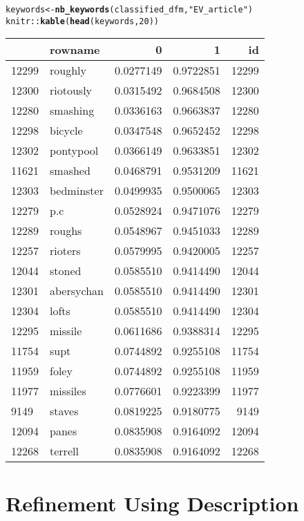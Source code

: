 \documentclass{article}\usepackage[]{graphicx}\usepackage[]{color}
\makeatletter
\newcommand{\hlnum}[1]{\textcolor[rgb]{0.686,0.059,0.569}{#1}}%
\newcommand{\hlstr}[1]{\textcolor[rgb]{0.192,0.494,0.8}{#1}}%
\newcommand{\hlopt}[1]{\textcolor[rgb]{0,0,0}{#1}}%
\newcommand{\hlstd}[1]{\textcolor[rgb]{0.345,0.345,0.345}{#1}}%
\newcommand{\hlkwb}[1]{\textcolor[rgb]{0.69,0.353,0.396}{#1}}%
\newcommand{\hlkwd}[1]{\textcolor[rgb]{0.737,0.353,0.396}{\textbf{#1}}}%
\newenvironment{kframe}{%
 \def\at@end@of@kframe{}%
 \ifinner\ifhmode%
  \def\at@end@of@kframe{\end{minipage}}%
  \begin{minipage}{\columnwidth}%
 \fi\fi%
 \def\FrameCommand##1{\hskip\@totalleftmargin \hskip-\fboxsep
 \colorbox{shadecolor}{##1}\hskip-\fboxsep
     \hskip-\linewidth \hskip-\@totalleftmargin \hskip\columnwidth}%
 \MakeFramed {\advance\hsize-\width
   \@totalleftmargin\z@ \linewidth\hsize
   \@setminipage}}%
 {\par\unskip\endMakeFramed%
 \at@end@of@kframe}
\newenvironment{knitrout}{}{} %
\makeatother
\begin{document}
\begin{knitrout}
\begin{kframe}
\begin{alltt}
\hlstd{keywords}\hlkwb{<-}\hlkwd{nb_keywords}\hlstd{(classified_dfm,} \hlstr{"EV_article"}\hlstd{)}
\hlstd{knitr}\hlopt{::}\hlkwd{kable}\hlstd{(}\hlkwd{head}\hlstd{(keywords,} \hlnum{20}\hlstd{))}
\end{alltt}
\end{kframe}
\begin{tabular}{l|l|r|r|r}
\hline
  & rowname & 0 & 1 & id\\
\hline
12299 & roughly & 0.0277149 & 0.9722851 & 12299\\
\hline
12300 & riotously & 0.0315492 & 0.9684508 & 12300\\
\hline
12280 & smashing & 0.0336163 & 0.9663837 & 12280\\
\hline
12298 & bicycle & 0.0347548 & 0.9652452 & 12298\\
\hline
12302 & pontypool & 0.0366149 & 0.9633851 & 12302\\
\hline
11621 & smashed & 0.0468791 & 0.9531209 & 11621\\
\hline
12303 & bedminster & 0.0499935 & 0.9500065 & 12303\\
\hline
12279 & p.c & 0.0528924 & 0.9471076 & 12279\\
\hline
12289 & roughs & 0.0548967 & 0.9451033 & 12289\\
\hline
12257 & rioters & 0.0579995 & 0.9420005 & 12257\\
\hline
12044 & stoned & 0.0585510 & 0.9414490 & 12044\\
\hline
12301 & abersychan & 0.0585510 & 0.9414490 & 12301\\
\hline
12304 & lofts & 0.0585510 & 0.9414490 & 12304\\
\hline
12295 & missile & 0.0611686 & 0.9388314 & 12295\\
\hline
11754 & supt & 0.0744892 & 0.9255108 & 11754\\
\hline
11959 & foley & 0.0744892 & 0.9255108 & 11959\\
\hline
11977 & missiles & 0.0776601 & 0.9223399 & 11977\\
\hline
9149 & staves & 0.0819225 & 0.9180775 & 9149\\
\hline
12094 & panes & 0.0835908 & 0.9164092 & 12094\\
\hline
12268 & terrell & 0.0835908 & 0.9164092 & 12268\\
\hline
\end{tabular}


\end{knitrout}

\section{Refinement Using Description}
\end{document}

